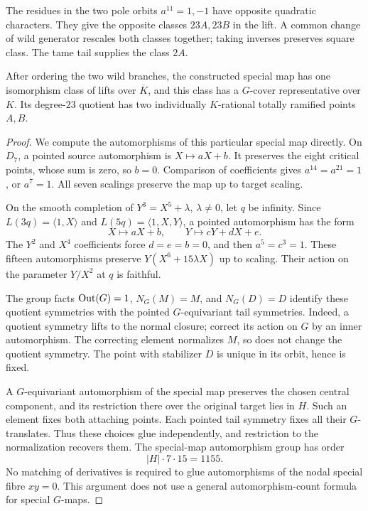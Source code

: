 The residues in the two pole orbits $a^{11}=1,-1$ have opposite
quadratic characters.  They give the opposite classes $23A,23B$ in
the lift.  A common change of wild generator rescales both classes
together; taking inverses preserves square class.  The tame tail
supplies the class $2A$.

\begin{proposition}
\label{prop:harmonic-marked-descent}
After ordering the two wild branches, the constructed special map
has one isomorphism class of lifts over $\overline K$, and this class
has a $G$-cover representative over $K$.  Its degree-$23$ quotient
has two individually $K$-rational totally ramified points $A,B$.
\end{proposition}

\begin{proof}
We compute the automorphisms of this particular special map directly.
On $D_7$, a pointed source automorphism is $X\mapsto aX+b$.
It preserves the eight critical points, whose sum is zero, so $b=0$.
Comparison of coefficients gives $a^{14}=a^{21}=1$, or $a^7=1$.
All seven scalings preserve the map up to target scaling.

On the smooth completion of $Y^3=X^5+\lambda$, $\lambda\ne0$, let
$q$ be infinity.  Since $L(3q)=\langle1,X\rangle$ and
$L(5q)=\langle1,X,Y\rangle$, a pointed automorphism has the form
\[
 X\longmapsto aX+b,\qquad Y\longmapsto cY+dX+e.
\]
The $Y^2$ and $X^4$ coefficients force $d=e=b=0$, and then
$a^5=c^3=1$.  These fifteen automorphisms preserve
$Y(X^6+15\lambda X)$ up to scaling.  Their action on the parameter
$Y/X^2$ at $q$ is faithful.

The group facts $\operatorname{Out}(G)=1$, $N_G(M)=M$, and $N_G(D)=D$ identify
these quotient symmetries with the pointed $G$-equivariant tail
symmetries.  Indeed, a quotient symmetry lifts to the normal closure;
correct its action on $G$ by an inner automorphism.  The correcting
element normalizes $M$, so does not change the quotient symmetry.
The point with stabilizer $D$ is unique in its orbit, hence is fixed.

A $G$-equivariant automorphism of the special map preserves the chosen
central component, and its restriction there over the original target
lies in $H$.  Such an element fixes both attaching points.  Each
pointed tail symmetry fixes all their $G$-translates.  Thus these
choices glue independently, and restriction to the normalization
recovers them.  The special-map automorphism group has order
\[
 |H|\cdot7\cdot15=1155.
\]
No matching of derivatives is required to glue automorphisms of the
nodal special fibre $xy=0$.  This argument does not use a general
automorphism-count formula for special $G$-maps.


\end{proof}

